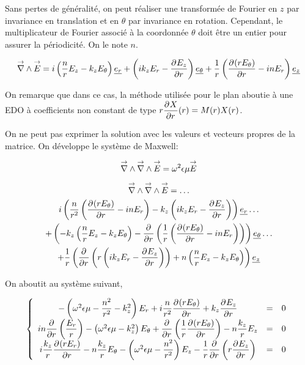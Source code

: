 Sans pertes de généralité, on peut réaliser une transformée de Fourier en $z$ par invariance en translation et en $\theta$ par invariance en rotation. Cependant, le multiplicateur de Fourier associé à la coordonnée $\theta$ doit être un entier pour assurer la périodicité. On le note $n$.

\begin{equation}
    \vrot \vE = i\left(\frac{n}{r}E_z - k_zE_\theta\right)\v{e_r} + 
    \left(ik_zE_r - \ddr{r}{E_z}\right)\v{e_\theta} +
    \frac{1}{r}\left(\ddr{r}{(rE_\theta)}-inE_r\right)\v{e_z}
\end{equation}

On remarque que dans ce cas, la méthode utilisée pour le plan aboutie à une EDO à coefficients non constant de type $r\ddr{r}{X}(r) = M(r)X(r)$.



On ne peut pas exprimer la solution avec les valeurs et vecteurs propres de la matrice. 
On développe le système de Maxwell:

\begin{equation}
    \vrot \vrot \vE = \w^2\eps\mu \vE
\end{equation}

\begin{multline}
    \vrot \vrot \vE = \dots\\
    i\left(\frac{n}{r^2}\left(\ddr{r}{(rE_\theta)} - inE_r\right) - k_z\left(ik_zE_r - \ddr{r}{E_z}\right)\right)    \v{e_r} \dots\\ 
    + \left(-k_z\left(\frac{n}{r}E_z - k_zE_\theta\right) -\ddr{r}{}\left(\frac{1}{r}\left(\ddr{r}{(rE_\theta)}-inE_r\right)\right)\right)    \v{e_\theta} \dots\\
    + \frac{1}{r}\left(\ddr{r}{} \left(r\left(ik_zE_r - \ddr{r}{E_z}\right)\right) + n \left(\frac{n}{r}E_z - k_zE_\theta\right)\right) \v{e_z}
\end{multline}

On aboutit au système suivant,

\begin{equation}
    \left\lbrace
    \begin{array}{ccc}
        -\left(\w^2\eps\mu -\frac{n^2}{r^2}  - k_z^2\right)E_r  +i\frac{n}{r^2}\ddr{r}{(rE_\theta)}  +k_z\ddr{r}{E_z} & = & 0\\
        in\ddr{r}{}\left(\frac{E_r}{r}\right) -\left(\w^2\eps\mu - k_z^2\right)E_\theta + \ddr{r}{}\left(\frac{1}{r}\ddr{r}{(rE_\theta)}\right)  - n\frac{k_z}{r}E_z & = & 0\\
        i\frac{k_z}{r}\ddr{r}{(rE_r)}  - n\frac{k_z}{r}E_\theta  -\left(\w^2\eps\mu - \frac{n^2}{r^2} \right)E_z - \frac{1}{r}\ddr{r}{}\left(r\ddr{r}{E_z}\right) & = & 0
    \end{array}
    \right.
\end{equation}

